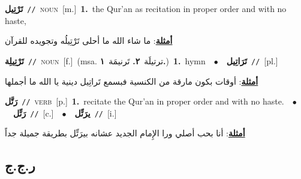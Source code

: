 \documentclass[10pt,a4paper,twoside]{article} %
\begin{document}
\begin{multicols}{2}
{\setlength\topsep{0pt}\textbf{\foreignlanguage{arabic}{تَرْتِيل}}\ {\color{gray}\texttt{//}\color{black}}\ \textsc{noun}\ [m.]\ \textbf{1.}~the Qur'an as recitation in proper order and with no haste,\  \begin{flushright}\color{gray}\foreignlanguage{arabic}{\textbf{\underline{\foreignlanguage{arabic}{أمثلة}}}: ما شاء الله ما أحلى تَرْتِيلُه وتجويده للقرآن}\end{flushright}\color{black}} \vspace{2mm}

{\setlength\topsep{0pt}\textbf{\foreignlanguage{arabic}{تَرْتِيلِة}}\ {\color{gray}\texttt{//}\color{black}}\ \textsc{noun}\ [f.]\ \color{gray}(msa. \foreignlanguage{arabic}{ترتيلَة}~\foreignlanguage{arabic}{\textbf{٢.}}  \foreignlanguage{arabic}{تَرنيمَة}~\foreignlanguage{arabic}{\textbf{١.}})\color{black}\ \textbf{1.}~hymn\ \ $\bullet$\ \ \setlength\topsep{0pt}\textbf{\foreignlanguage{arabic}{تَرَاتِيل}}\ {\color{gray}\texttt{//}\color{black}}\ [pl.]\  \begin{flushright}\color{gray}\foreignlanguage{arabic}{\textbf{\underline{\foreignlanguage{arabic}{أمثلة}}}: أوقات بكون مارقة من الكنسية فبسمع تَراتِيل دينية يا الله ما أجملها}\end{flushright}\color{black}} \vspace{2mm}

{\setlength\topsep{0pt}\textbf{\foreignlanguage{arabic}{رَتَّل}}\ {\color{gray}\texttt{//}\color{black}}\ \textsc{verb}\ [p.]\ \textbf{1.}~recitate the Qur'an in proper order and with no haste.\ \ $\bullet$\ \ \setlength\topsep{0pt}\textbf{\foreignlanguage{arabic}{رَتِّل}}\ {\color{gray}\texttt{//}\color{black}}\ [c.]\ \ $\bullet$\ \ \setlength\topsep{0pt}\textbf{\foreignlanguage{arabic}{يرَتِّل}}\ {\color{gray}\texttt{//}\color{black}}\ [i.]\  \begin{flushright}\color{gray}\foreignlanguage{arabic}{\textbf{\underline{\foreignlanguage{arabic}{أمثلة}}}: أنا بحب أصلي ورا الإِمام الجديد عشانه بيرَتِّل بطريقة جميلة جداً}\end{flushright}\color{black}} \vspace{2mm}

\vspace{-3mm}
\subsection*{\color{blue}\foreignlanguage{arabic}{ر.ج.ج}\color{blue}{}} 


\end{multicols}
\end{document}
